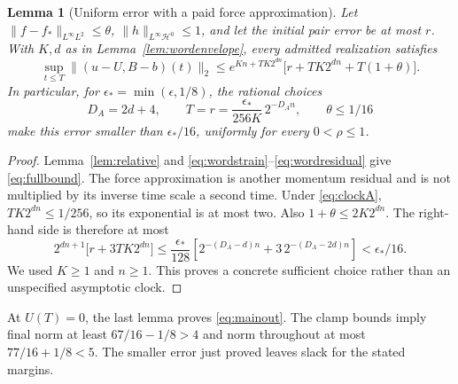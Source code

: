 \documentclass[11pt,a4paper]{amsart}
\newtheorem{lemma}[theorem]{Lemma}
\theoremstyle{definition}
\theoremstyle{remark}
\numberwithin{equation}{section}
\newcommand{\Hcal}{\mathcal H}
\newcommand{\norm}[1]{\lVert #1\rVert}
\begin{document}
\begin{lemma}[Uniform error with a paid force approximation]\label{lem:rapidbudget}
Let $\norm{f-f_*}_{L^\infty L^2}\le\theta$, $\norm h_{L^\infty\Hcal^0}\le1$, and let the initial pair error be at most $r$. With $K,d$ as in Lemma~\ref{lem:wordenvelope}, every admitted realization satisfies
\begin{equation}\label{eq:fullbound}
 \sup_{t\le T}\norm{(u-U,B-b)(t)}_2
 \le e^{Kn+TK2^{dn}}
          \big[r+T K2^{dn}+T(1+\theta)\big].
\end{equation}
In particular, for $\epsilon_*=\min(\epsilon,1/8)$, the rational choices
\begin{equation}\label{eq:clockA}
 D_A=2d+4,\qquad
 T=r=\frac{\epsilon_*}{256K}\,2^{-D_A n},
 \qquad\theta\le1/16
\end{equation}
make this error smaller than $\epsilon_*/16$, uniformly for every $0<\rho\le1$.
\end{lemma}

\begin{proof}
Lemma~\ref{lem:relative} and \eqref{eq:wordstrain}--\eqref{eq:wordresidual} give \eqref{eq:fullbound}. The force approximation is another momentum residual and is not multiplied by its inverse time scale a second time. Under \eqref{eq:clockA}, $TK2^{dn}\le1/256$, so its exponential is at most two. Also $1+\theta\le2K2^{dn}$. The right-hand side is therefore at most
\[
 2^{dn+1}\big[r+3TK2^{dn}\big]
 \le\frac{\epsilon_*}{128}
       \left[2^{-(D_A-d)n}+3\,2^{-(D_A-2d)n}\right]
 <\epsilon_*/16.
\]
We used $K\ge1$ and $n\ge1$. This proves a concrete sufficient choice rather than an unspecified asymptotic clock.
\end{proof}

At $U(T)=0$, the last lemma proves \eqref{eq:mainout}. The clamp bounds imply final norm at least $67/16-1/8>4$ and norm throughout at most $77/16+1/8<5$. The smaller error just proved leaves slack for the stated margins.
\end{document}
